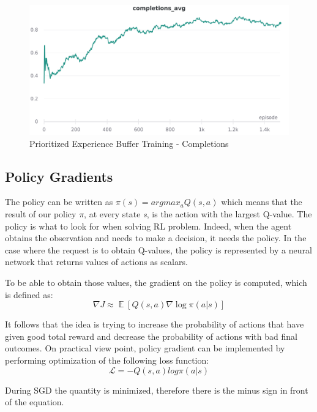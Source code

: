 \documentclass[12pt]{article}
\DeclareMathOperator{\EX}{\mathbb{E}}%
\begin{document}
\begin{figure}[H]
        \centerline{\includegraphics[scale=.2]{res/charts/per_completions.png}}
        \caption{Prioritized Experience Buffer Training - Completions}
\end{figure}

\subsection{Policy Gradients}

The policy can be written as $\pi(s)= argmax_aQ(s,a)$ which means that the result of our policy $\pi$, at every state \textit{s}, is the action with the largest Q-value.
The policy is what to look for when solving RL problem. Indeed, when the agent obtains the observation and needs to make a decision, it needs the policy.
In the case where the request is to obtain Q-values, the policy is represented by a neural network that returns values of actions as scalars. 

To be able to obtain those values, the gradient on the policy is computed, which is defined as:
\begin{equation}
    \nabla J \approx \EX[Q(s, a) \nabla \log \pi (a | s) ]
\end{equation}

It follows that the idea is trying to increase the probability of actions that have given good total reward and decrease the probability of actions with bad final outcomes.
On practical view point, policy gradient can be implemented by performing optimization of the following loss function:
\[ \mathcal{L}= -Q(s,a)log \pi(a|s)\]

During SGD the quantity is minimized, therefore there is the minus sign in front of the equation.
\end{document}
